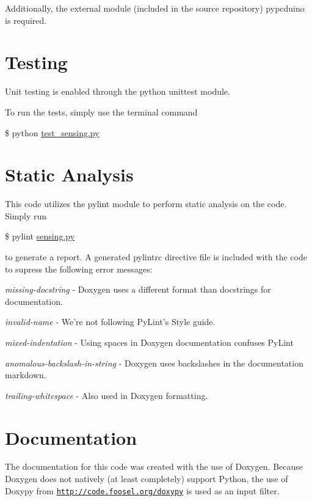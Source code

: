 Additionally, the external module (included in the source repository) pypcduino is required.\hypertarget{index_testing}{}\section{Testing}\label{index_testing}
Unit testing is enabled through the python unittest module.

To run the tests, simply use the terminal command

\$ python \hyperlink{test__sensing_8py}{test\-\_\-sensing.\-py}\hypertarget{index_static}{}\section{Static Analysis}\label{index_static}
This code utilizes the pylint module to perform static analysis on the code. Simply run

\$ pylint \hyperlink{sensing_8py}{sensing.\-py}

to generate a report. A generated pylintrc directive file is included with the code to supress the following error messages\-:

{\itshape missing-\/docstring} -\/ Doxygen uses a different format than docstrings for documentation.

{\itshape invalid-\/name} -\/ We're not following Py\-Lint's Style guide.

{\itshape mixed-\/indentation} -\/ Using spaces in Doxygen documentation confuses Py\-Lint

{\itshape anomalous-\/backslash-\/in-\/string} -\/ Doxygen uses backslashes in the documentation markdown.

{\itshape trailing-\/whitespace} -\/ Also used in Doxygen formatting.\hypertarget{index_documents}{}\section{Documentation}\label{index_documents}
The documentation for this code was created with the use of Doxygen. Because Doxygen does not natively (at least completely) support Python, the use of Doxypy from \href{http://code.foosel.org/doxypy}{\tt http\-://code.\-foosel.\-org/doxypy} is used as an input filter. 